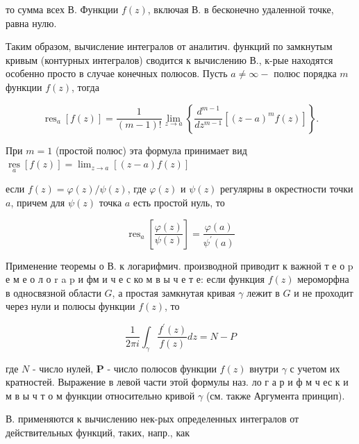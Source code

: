 \documentclass[10pt]{article}
\begin{document}
то сумма всех В. Функции $f(z)$, включая В. в бесконечно удаленной точке, равна нулю.



Таким образом, вычисление интегралов от аналитич. функций по замкнутым кривым (контурных интегралов) сводится к вычислению В., к-рые находятся особенно просто в случае конечных полюсов. Пусть $a \neq \infty-$ полюс порядка $m$ функции $f(z)$, тогда



\[

\operatorname{res}_{a}[f(z)]=\frac{1}{(m-1) !} \lim _{z \rightarrow a}\left\{\frac{d^{m-1}}{d z^{m-1}}\left[(z-a)^{m} f(z)\right]\right\} .

\]



При $m=1$ (простой полюс) эта формула принимает вид $\underset{a}{\operatorname{res}}[f(z)]=\lim _{z \rightarrow a}[(z-a) f(z)]$



если $f(z)=\varphi(z) / \psi(z)$, где $\varphi(z)$ и $\psi(z)$ регулярны в окрестности точки $a$, причем для $\psi(z)$ точка $a$ есть простой нуль, то



\[

\operatorname{res}_{a}\left[\frac{\varphi(z)}{\psi(z)}\right]=\frac{\varphi(a)}{\psi^{\prime}(a)}

\]



Применение теоремы о В. к логарифмич. производной приводит к важной т е о $\mathrm{p}$ е м е о л о r a p и фм и ч е с ко м в ы ч е т е: если функция $f(z)$ мероморфна в односвязной области $G$, а простая замкнутая кривая $\gamma$ лежит в $G$ и не проходит через нули и полюсы функции $f(z)$, то



\[

\frac{1}{2 \pi i} \int_{\gamma} \frac{f^{\prime}(z)}{f(z)} d z=N-P

\]



где $N$ - число нулей, $\boldsymbol{P}$ - число полюсов функции $f(z)$ внутри $\gamma$ с учетом их кратностей. Выражение в левой части этой формулы наз. ло г а р и ф м ч ес к и м в ы ч т о м функции относительно кривой $\gamma$ (см. также Аргумента принцип).



В. применяются к вычислению нек-рых определенных интегралов от действительных функций, таких, напр., как
\end{document}

